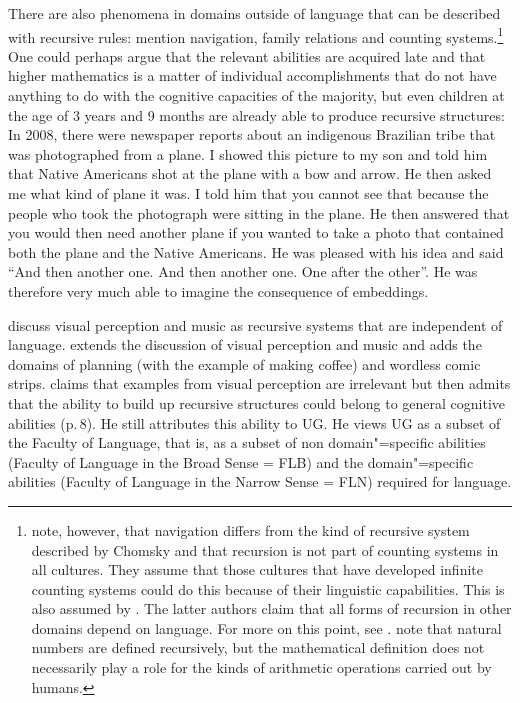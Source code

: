 There are also phenomena in domains outside of language that can be described with recursive rules:
\citet*[]{HCF2002a} mention navigation, family relations and counting systems.\footnote{\label{fn-Rekursion-Mathematik}%
  \citet[]{PJ2005a} note, however, that navigation differs from the kind of recursive system described by Chomsky and that recursion
  is not part of counting systems in all cultures. They assume that those cultures that have developed
  infinite counting systems could do this because of their linguistic capabilities. This is also assumed by \citet*[]{FHC2005a}.
  The latter authors claim that all forms of recursion in other domains depend on language. For more on this point, see
  . \citet{LL2011a} note that natural numbers are defined
  recursively, but the mathematical definition does not necessarily play a role for the kinds of arithmetic operations carried out by humans.
}
One could perhaps argue that the relevant abilities are acquired late and that higher mathematics is a matter of individual accomplishments that do not
have anything to do with the cognitive capacities of the majority, but even children at the age of 3
years and 9 months are already able to produce recursive structures:
In 2008, there were newspaper reports about an indigenous Brazilian tribe that was photographed from
a plane. I showed this picture to my son and told him that Native Americans shot at the plane with a bow and arrow. He then asked me what kind of plane it was. I told him that you cannot 
see that because the people
who took the photograph were sitting in the plane. He then answered that you would then need another
plane if you wanted to take a photo that contained both the plane and the Native Americans. He was
pleased with his idea and said ``And then another one. And then another one. One after the
other''. He was therefore very much able to imagine the consequence of embeddings.

\citet[--114]{CJ2005a} discuss visual perception and music as recursive systems that are
independent of language. \citet{Jackendoff2011a} extends the discussion of visual perception and
music and adds the domains of planning (with the example of making coffee) and wordless comic strips.
\citet[--8]{Chomsky2007a} claims that examples from visual perception are irrelevant but then admits that the ability to build up recursive structures
could belong to general cognitive abilities (p.\,8).
He still attributes this ability to UG. He views UG as a subset of the Faculty of Language, that is, as a subset of non domain"=specific abilities
(Faculty of Language in the Broad Sense = FLB) and the domain"=specific abilities (Faculty of Language in the Narrow Sense = FLN) required for language.


